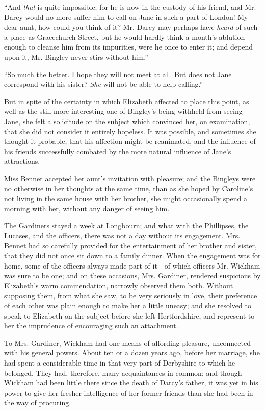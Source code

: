“And {\em that} is quite impossible; for he is now in the custody of his friend, and Mr. Darcy would no more suffer him to call on Jane in such a part of London! My dear aunt, how could you think of it? Mr. Darcy may perhaps have {\em heard} of such a place as Gracechurch Street, but he would hardly think a month's ablution enough to cleanse him from its impurities, were he once to enter it; and depend upon it, Mr. Bingley never stirs without him.”

“So much the better. I hope they will not meet at all. But does not Jane correspond with his sister? {\em She} will not be able to help calling.”


But in spite of the certainty in which Elizabeth affected to place this point, as well as the still more interesting one of Bingley's being withheld from seeing Jane, she felt a solicitude on the subject which convinced her, on examination, that she did not consider it entirely hopeless. It was possible, and sometimes she thought it probable, that his affection might be reanimated, and the influence of his friends successfully combated by the more natural influence of Jane's attractions.

Miss Bennet accepted her aunt's invitation with pleasure; and the Bingleys were no otherwise in her thoughts at the same time, than as she hoped by Caroline's not living in the same house with her brother, she might occasionally spend a morning with her, without any danger of seeing him.

The Gardiners stayed a week at Longbourn; and what with the Phillipses, the Lucases, and the officers, there was not a day without its engagement. Mrs. Bennet had so carefully provided for the entertainment of her brother and sister, that they did not once sit down to a family dinner. When the engagement was for home, some of the officers always made part of it---of which officers Mr. Wickham was sure to be one; and on these occasions, Mrs. Gardiner, rendered suspicious by Elizabeth's warm commendation, narrowly observed them both. Without supposing them, from what she saw, to be very seriously in love, their preference of each other was plain enough to make her a little uneasy; and she resolved to speak to Elizabeth on the subject before she left Hertfordshire, and represent to her the imprudence of encouraging such an attachment.

To Mrs. Gardiner, Wickham had one means of affording pleasure, unconnected with his general powers. About ten or a dozen years ago, before her marriage, she had spent a considerable time in that very part of Derbyshire to which he belonged. They had, therefore, many acquaintances in common; and though Wickham had been little there since the death of Darcy's father, it was yet in his power to give her fresher intelligence of her former friends than she had been in the way of procuring.


